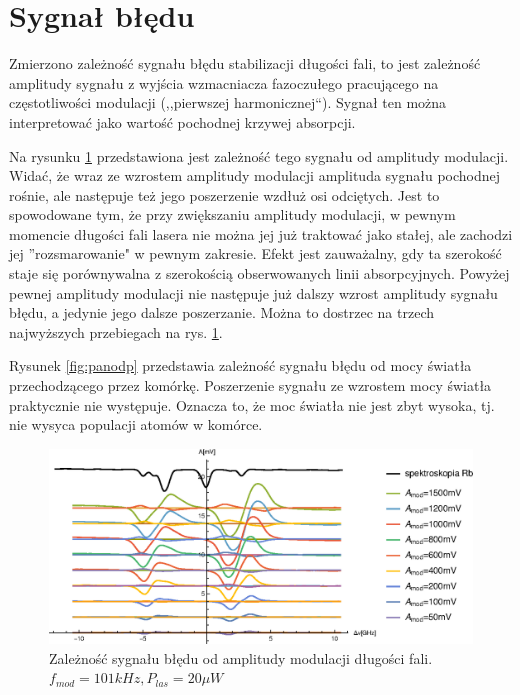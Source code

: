 \documentclass[a4paper,10pt,twoside]{article}
\begin{document}
\section{Sygnał błędu}

Zmierzono zależność sygnału błędu stabilizacji długości fali, to jest zależność amplitudy sygnału z wyjścia wzmacniacza fazoczułego pracującego na częstotliwości modulacji (,,pierwszej harmonicznej``). Sygnał ten można interpretować jako wartość pochodnej krzywej absorpcji.

Na rysunku \ref{fig:panoda} przedstawiona jest zależność tego sygnału od amplitudy modulacji. Widać, że wraz ze wzrostem amplitudy modulacji amplituda sygnału pochodnej rośnie, ale następuje też jego poszerzenie wzdłuż osi odciętych. Jest to spowodowane tym, że przy zwiększaniu amplitudy modulacji, w pewnym momencie długości fali lasera nie można jej już traktować jako stałej, ale zachodzi jej ''rozsmarowanie" w pewnym zakresie. Efekt jest zauważalny, gdy ta szerokość staje się porównywalna z szerokością obserwowanych linii absorpcyjnych. Powyżej pewnej amplitudy modulacji nie następuje już dalszy wzrost amplitudy sygnału błędu, a jedynie jego dalsze poszerzanie. Można to dostrzec na trzech najwyższych przebiegach na rys. \ref{fig:panoda}.

Rysunek \ref{fig:panodp} przedstawia zależność sygnału błędu od mocy światła przechodzącego przez komórkę. Poszerzenie sygnału ze wzrostem mocy światła praktycznie nie występuje. Oznacza to, że moc światła nie jest zbyt wysoka, tj. nie wysyca populacji atomów w komórce.


\begin{figure}[h!]
\centering
 \includegraphics[width=\textwidth]{panoramy_1H_oda.eps}
 \caption{Zależność sygnału błędu od amplitudy modulacji długości fali. $f_{mod}=101kHz, P_{las}=20 \mu W$}
 \label{fig:panoda}
\end{figure}
\end{document}
